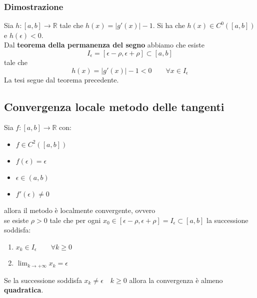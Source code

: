 \subsubsection{Dimostrazione}
Sia $h: [a,b] \to \mathbb{R}$ tale che $h(x) = \lvert g'(x) \rvert -1$. Si ha che $h(x) \in C^0([a,b])$ e $h(\epsilon) < 0$.\\
Dal \textbf{teorema della permanenza del segno} abbiamo che esiste
\begin{equation*}
	I_\epsilon = [\epsilon-\rho, \epsilon+\rho] \subset [a,b]
\end{equation*}
tale che
\begin{equation*}
	h(x) = \lvert g'(x) \rvert -1 < 0 \quad\quad \forall x \in I_\epsilon
\end{equation*}
La tesi segue dal teorema precedente.
\subsection{Convergenza locale metodo delle tangenti}
\begin{theorem}
	Sia $f:[a,b]\to \mathbb{R}$ con:
	\begin{itemize}
		\item $f \in C^2([a,b])$
		\item $f(\epsilon) = \epsilon$
		\item $\epsilon \in (a,b)$
		\item $f'(\epsilon) \neq 0$
	\end{itemize}
	allora il metodo è localmente convergente, ovvero \\
	se esiste $\rho > 0$ tale che per ogni $x_0 \in [\epsilon - \rho, \epsilon + \rho] = I_\epsilon \subset [a,b]$ la successione soddisfa:
	\begin{enumerate}
		\item $x_k \in I_\epsilon \quad\quad \forall k\geq 0$
		\item $\lim_{k \to +\infty} x_k = \epsilon$
	\end{enumerate}
	Se la successione soddisfa $x_k \neq \epsilon \quad k \geq 0$ allora la convergenza è almeno \textbf{quadratica}.
\end{theorem}
